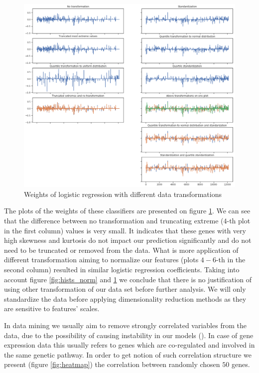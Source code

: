 \documentclass[12pt, wide]{mwart}
\begin{document}
\begin{figure}
\centering
\includegraphics[width=\textwidth]{images/normalization_coeffs.png}
\caption{Weights of logistic regression with different data transformations}
\label{fig:normalization}
\end{figure}

The plots of the weights of these classifiers are presented on figure \ref{fig:normalization}. We can see that the difference between no transformation and truncating extreme ($4$-th plot in the first column) values is very small. It indicates that these genes with very high skewness and kurtosis do not impact our prediction significantly and do not need to be truncated or removed from the data. What is more application of different transformation aiming to normalize our features (plots $4-6$-th in the second column) resulted in similar logistic regression coefficients. Taking into account figure \ref{fig:hists_norm} and \ref{fig:normalization} we conclude that there is no justification of using other transformation of our data set before further analysis. We will only standardize the data before applying dimensionality reduction methods as they are sensitive to features' scales.

In data mining we usually aim to remove strongly correlated variables from the data, due to the possibility of causing instability in our models (\cite{Correlation}). In case of gene expression data this usually refers to genes which are co-regulated and involved in the same genetic pathway. In order to get notion of such correlation structure we present (figure \ref{fig:heatmap}) the correlation between randomly chosen $50$ genes. 
\end{document}
